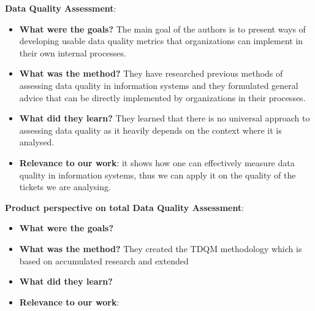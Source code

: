 \documentclass{mprop}
\begin{document}
\textbf{Data Quality Assessment}\cite{pipino2002data}:
\begin{itemize}
  \item \textbf{What were the goals?}
    The main goal of the authors is to present ways of developing usable data
    quality metrics that organizations can implement in their own internal 
    processes.
  \item \textbf{What was the method?}
    They have researched previous methods of assessing data quality in information
    systems and they formulated general advice that can be directly implemented
    by organizations in their processes.
  \item \textbf{What did they learn?}
    They learned that there is no universal approach to assessing data quality
    as it heavily depends on the context where it is analysed.
  \item \textbf{Relevance to our work}: it shows how one can effectively measure
    data quality in information systems, thus we can apply it on the quality of
    the tickets we are analysing.
\end{itemize}

\textbf{Product perspective on total 
        Data Quality Assessment}\cite{wang1998product}:
\begin{itemize}
  \item \textbf{What were the goals?}
    
  \item \textbf{What was the method?}
    They created the TDQM methodology which is based on accumulated research 
    and extended 
  \item \textbf{What did they learn?}
  \item \textbf{Relevance to our work}:
\end{itemize}
\end{document}
